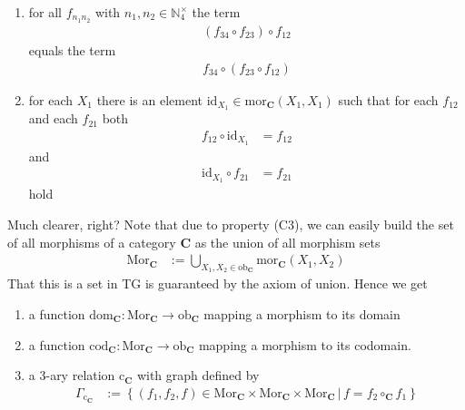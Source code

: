 \begin{enumerate}
\item[(C1)]
for all $f_{n_{1}n_{2}}$ with $n_{1},n_{2} \in \mathbb{N}_{4}^{\times}$ the term
\begin{align*}
  (f_{34} \circ f_{23})
  \circ
  f_{12}
\end{align*}
equals the term
\begin{align*}
  f_{34}
  \circ
  (f_{23} \circ f_{12})
\end{align*}
\item[(C2)]
for each $X_{1}$ there is an element $\mathrm{id}_{X_{1}} \in \mathrm{mor}_{\mathbf{C}}(X_{1},X_{1})$ such that for each $f_{12}$ and each $f_{21}$ both
\begin{align*}
  f_{12}
  \circ
  \mathrm{id}_{X_{1}}
  &=
  f_{12}
\end{align*}
and
\begin{align*}
  \mathrm{id}_{X_{1}}
  \circ
  f_{21}
  &=
  f_{21}
\end{align*}
hold
\end{enumerate}
Much clearer, right?
Note that due to property (C3), we can easily build the set of all morphisms of a category $\mathbf{C}$ as the union of all morphism sets
\begin{align*}
  \mathrm{Mor}_{\mathbf{C}}
  &:=
  \bigcup_{X_{1},X_{2} \in \mathrm{ob}_{\mathbf{C}}}
  \mathrm{mor}_{\mathbf{C}}(X_{1},X_{2})
\end{align*}
That this is a set in TG is guaranteed by the axiom of union.
Hence we get
\begin{enumerate}
\item[(1)]
a function $\mathrm{dom}_{\mathbf{C}} \colon \mathrm{Mor}_{\mathbf{C}} \rightarrow \mathrm{ob}_{\mathbf{C}}$ mapping a morphism to its domain
\item[(2)]
a function $\mathrm{cod}_{\mathbf{C}} \colon \mathrm{Mor}_{\mathbf{C}} \rightarrow \mathrm{ob}_{\mathbf{C}}$ mapping a morphism to its codomain.
\item[(3)]
a $3$-ary relation $\mathrm{c}_{\mathbf{C}}$ with graph defined by
\begin{align*}
  \Gamma_{\mathrm{c}_{\mathbf{C}}}
  &:=
  \left\lbrace
      (f_{1},f_{2},f)
      \in
      \mathrm{Mor}_{\mathbf{C}}
      \times
      \mathrm{Mor}_{\mathbf{C}}
      \times
      \mathrm{Mor}_{\mathbf{C}}
    \,
    \vert
    \,
      f
      =
      f_{2}
      \circ_{\mathbf{C}}
      f_{1}
  \right\rbrace
\end{align*}
\end{enumerate}
